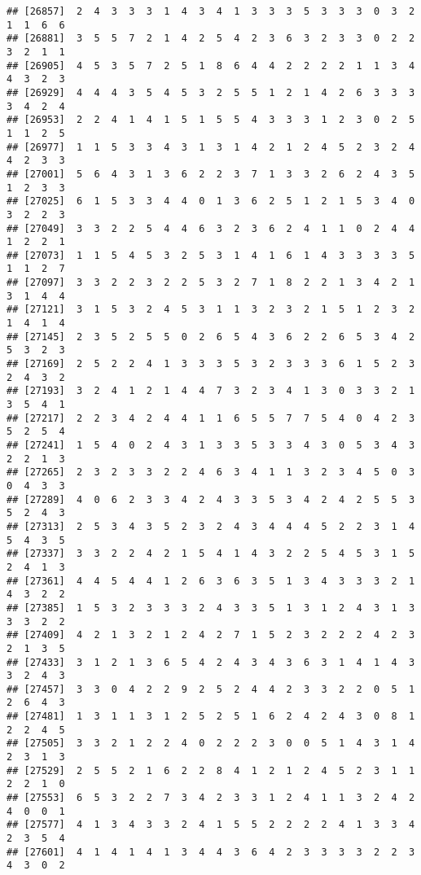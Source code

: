 \documentclass[
]{article}
\begin{document}
\begin{verbatim}
## [26857]  2  4  3  3  3  1  4  3  4  1  3  3  3  5  3  3  3  0  3  2  1  1  6  6
## [26881]  3  5  5  7  2  1  4  2  5  4  2  3  6  3  2  3  3  0  2  2  3  2  1  1
## [26905]  4  5  3  5  7  2  5  1  8  6  4  4  2  2  2  2  1  1  3  4  4  3  2  3
## [26929]  4  4  4  3  5  4  5  3  2  5  5  1  2  1  4  2  6  3  3  3  3  4  2  4
## [26953]  2  2  4  1  4  1  5  1  5  5  4  3  3  3  1  2  3  0  2  5  1  1  2  5
## [26977]  1  1  5  3  3  4  3  1  3  1  4  2  1  2  4  5  2  3  2  4  4  2  3  3
## [27001]  5  6  4  3  1  3  6  2  2  3  7  1  3  3  2  6  2  4  3  5  1  2  3  3
## [27025]  6  1  5  3  3  4  4  0  1  3  6  2  5  1  2  1  5  3  4  0  3  2  2  3
## [27049]  3  3  2  2  5  4  4  6  3  2  3  6  2  4  1  1  0  2  4  4  1  2  2  1
## [27073]  1  1  5  4  5  3  2  5  3  1  4  1  6  1  4  3  3  3  3  5  1  1  2  7
## [27097]  3  3  2  2  3  2  2  5  3  2  7  1  8  2  2  1  3  4  2  1  3  1  4  4
## [27121]  3  1  5  3  2  4  5  3  1  1  3  2  3  2  1  5  1  2  3  2  1  4  1  4
## [27145]  2  3  5  2  5  5  0  2  6  5  4  3  6  2  2  6  5  3  4  2  5  3  2  3
## [27169]  2  5  2  2  4  1  3  3  3  5  3  2  3  3  3  6  1  5  2  3  2  4  3  2
## [27193]  3  2  4  1  2  1  4  4  7  3  2  3  4  1  3  0  3  3  2  1  3  5  4  1
## [27217]  2  2  3  4  2  4  4  1  1  6  5  5  7  7  5  4  0  4  2  3  5  2  5  4
## [27241]  1  5  4  0  2  4  3  1  3  3  5  3  3  4  3  0  5  3  4  3  2  2  1  3
## [27265]  2  3  2  3  3  2  2  4  6  3  4  1  1  3  2  3  4  5  0  3  0  4  3  3
## [27289]  4  0  6  2  3  3  4  2  4  3  3  5  3  4  2  4  2  5  5  3  5  2  4  3
## [27313]  2  5  3  4  3  5  2  3  2  4  3  4  4  4  5  2  2  3  1  4  5  4  3  5
## [27337]  3  3  2  2  4  2  1  5  4  1  4  3  2  2  5  4  5  3  1  5  2  4  1  3
## [27361]  4  4  5  4  4  1  2  6  3  6  3  5  1  3  4  3  3  3  2  1  4  3  2  2
## [27385]  1  5  3  2  3  3  3  2  4  3  3  5  1  3  1  2  4  3  1  3  3  3  2  2
## [27409]  4  2  1  3  2  1  2  4  2  7  1  5  2  3  2  2  2  4  2  3  2  1  3  5
## [27433]  3  1  2  1  3  6  5  4  2  4  3  4  3  6  3  1  4  1  4  3  3  2  4  3
## [27457]  3  3  0  4  2  2  9  2  5  2  4  4  2  3  3  2  2  0  5  1  2  6  4  3
## [27481]  1  3  1  1  3  1  2  5  2  5  1  6  2  4  2  4  3  0  8  1  2  2  4  5
## [27505]  3  3  2  1  2  2  4  0  2  2  2  3  0  0  5  1  4  3  1  4  2  3  1  3
## [27529]  2  5  5  2  1  6  2  2  8  4  1  2  1  2  4  5  2  3  1  1  2  2  1  0
## [27553]  6  5  3  2  2  7  3  4  2  3  3  1  2  4  1  1  3  2  4  2  4  0  0  1
## [27577]  4  1  3  4  3  3  2  4  1  5  5  2  2  2  2  4  1  3  3  4  2  3  5  4
## [27601]  4  1  4  1  4  1  3  4  4  3  6  4  2  3  3  3  3  2  2  3  4  3  0  2

\end{verbatim}
\end{document}
